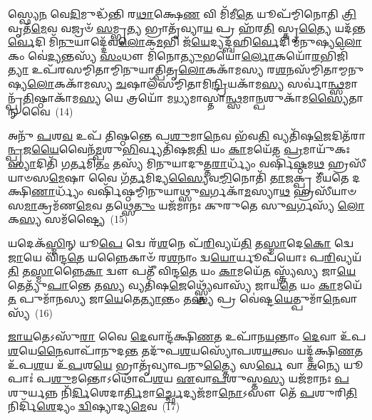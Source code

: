 𑌸𑍍𑌫𑍍𑌯𑍇\-\ul{𑌨} 𑌵𑍇\-\ul{𑌦𑌿}\-𑌮𑍁𑌦𑍍𑌧᳴𑌨𑍍𑌤𑌿 𑌰\-\ul{𑌥𑌾}\-𑌕𑍍𑌷𑍇\-\ul{𑌣} 𑌵𑌿 𑌮𑌿᳴𑌮𑍀\-\ul{𑌤𑍇} 𑌯𑍂𑌪᳴𑌮𑍍𑌮𑌿𑌨𑍋𑌤𑌿 \ul{𑌤𑍍𑌰𑌿}\-𑌵𑍃𑌤᳴\-\ul{𑌮𑍇}\-𑌵 𑌵𑌜𑍍𑌰𑍞᳴ \ul{𑌸}\-𑌮𑍍𑌭𑍃\-\ul{𑌤𑍍𑌯} 𑌭𑍍𑌰𑌾𑌤𑍃᳴𑌵𑍍𑌯𑌾\-\ul{𑌯} 𑌪𑍍𑌰 𑌹᳴𑌰\-\ul{𑌤𑌿} 𑌸𑍍𑌤𑍃\-\ul{𑌤𑍍𑌯𑍈} 𑌯𑌦᳴𑌨𑍍𑌤\-\ul{𑌰𑍍𑌵𑍇}\-𑌦𑌿 𑌮𑌿᳴\-\ul{𑌨𑍁}\-𑌯𑌾𑌦𑍍𑌦𑍇᳴𑌵\-\ul{𑌲𑍋}\-𑌕\-\ul{𑌮}\-𑌭𑌿 𑌜᳴\-\ul{𑌯𑍇}\-𑌦𑍍𑌯𑌦𑍍𑌬᳴𑌹𑌿\-\ul{𑌰𑍍𑌵𑍇}\-𑌦𑌿 𑌮᳴𑌨𑍁𑌷𑍍𑌯\-\ul{𑌲𑍋}\-𑌕𑌂 𑌵𑍇॑\-\ul{𑌦𑍍𑌯}\-𑌨𑍍𑌤𑌸𑍍𑌯᳴ \ul{𑌸𑌂}\-𑌧𑍗 𑌮𑌿᳴𑌨𑍋\-\ul{𑌤𑍍𑌯𑍁}\-𑌭𑌯𑍋॑\-\ul{𑌰𑍍𑌲𑍋}\-𑌕𑌯𑍋᳴\-\ul{𑌰}\-𑌭𑌿𑌜𑌿᳴\-\ul{𑌤𑍍𑌯𑌾} 𑌉𑌪᳴𑌰𑌸𑌮𑍍𑌮𑌿𑌤𑌾𑌮𑍍𑌮𑌿𑌨𑍁𑌯𑌾𑌤𑍍𑌪𑌿𑌤𑍃\-\ul{𑌲𑍋}\-𑌕𑌕𑌾᳴𑌮𑌸𑍍𑌯 𑌰\-\ul{𑌶}\-𑌨𑌸᳴𑌮𑍍𑌮𑌿𑌤𑌾𑌮𑍍𑌮𑌨𑍁𑌷𑍍𑌯\-\ul{𑌲𑍋}\-𑌕𑌕𑌾᳴𑌮𑌸𑍍𑌯 \ul{𑌚}\-𑌷𑌾𑌲᳴𑌸𑌮𑍍𑌮𑌿𑌤𑌾𑌮𑌿\-\ul{𑌨𑍍𑌦𑍍𑌰𑌿}\-𑌯𑌕𑌾᳴𑌮\-\ul{𑌸𑍍𑌯} 𑌸𑌰𑍍𑌵𑌾॑\-\ul{𑌨𑍍𑌥𑍍𑌸}\-𑌮𑌾𑌨𑍍𑌪𑍍𑌰᳴\-\ul{𑌤𑌿}\-𑌷𑍍𑌠𑌾𑌕𑌾᳴𑌮\-\ul{𑌸𑍍𑌯} 𑌯𑍇 𑌤𑍍𑌰𑌯𑍋᳴ 𑌮\-\ul{𑌧𑍍𑌯}\-𑌮𑌾𑌸𑍍𑌤𑌾\-\ul{𑌨𑍍𑌥𑍍𑌸}\-𑌮𑌾\-\ul{𑌨𑍍𑌪}\-𑌶𑍁𑌕𑌾᳴𑌮\-\ul{𑌸𑍍𑌯𑍈}\-𑌤𑌾𑌨𑍍 𑌵𑍈~(14)

𑌅𑌨𑍁᳴ \ul{𑌪}\-𑌶\-\ul{𑌵} 𑌉𑌪᳴ 𑌤𑌿𑌷𑍍𑌠𑌨𑍍𑌤𑍇 𑌪\-\ul{𑌶𑍁}\-𑌮𑌾\-\ul{𑌨𑍇}\-𑌵 𑌭᳴𑌵\-\ul{𑌤𑌿} 𑌵𑍍𑌯𑌤𑌿᳴𑌷\-\ul{𑌜𑍇}\-𑌦𑌿𑌤᳴𑌰𑌾\-\ul{𑌨𑍍𑌪𑍍𑌰}\-𑌜\-\ul{𑌯𑍈}\-𑌵𑍈𑌨᳴\-\ul{𑌮𑍍𑌪}\-𑌶𑍁\-\ul{𑌭𑌿}\-𑌰𑍍𑌵𑍍𑌯𑌤𑌿᳴𑌷𑌜\-\ul{𑌤𑌿} 𑌯𑌂 \ul{𑌕𑌾}\-𑌮𑌯𑍇᳴𑌤 \ul{𑌪𑍍𑌰}\-𑌮𑌾𑌯𑍁᳴𑌕𑌃 \ul{𑌸𑍍𑌯𑌾}\-𑌦𑌿𑌤𑌿᳴ 𑌗\-\ul{𑌰𑍍𑌤}\-𑌮𑌿\-\ul{𑌤𑌂} 𑌤𑌸𑍍𑌯᳴ 𑌮𑌿𑌨𑍁𑌯𑌾𑌦𑍁𑌤𑍍𑌤\-\ul{𑌰𑌾}\-𑌰𑍍𑌧𑍍𑌯𑌂᳴ 𑌵𑌰𑍍\mbox{}𑌷𑌿᳴\-\ul{𑌷𑍍𑌠}\-𑌮\-\ul{𑌥} 𑌹𑍍𑌰𑌸𑍀᳴𑌯𑌾𑍞𑌸\-\ul{𑌮𑍇}\-𑌷𑌾 𑌵𑍈 𑌗᳴\-\ul{𑌰𑍍𑌤}\-𑌮𑌿𑌦𑍍𑌯\-\ul{𑌸𑍍𑌯𑍈}\-𑌵\-\ul{𑌮𑍍𑌮𑌿}\-𑌨𑍋𑌤𑌿᳴ \ul{𑌤𑌾}\-𑌜𑌕𑍍𑌪𑍍𑌰 𑌮𑍀᳴𑌯𑌤𑍇 𑌦𑌕𑍍𑌷𑌿\-\ul{𑌣𑌾}\-𑌰𑍍𑌧𑍍𑌯𑌂᳴ 𑌵𑌰𑍍\mbox{}𑌷𑌿᳴𑌷𑍍𑌠𑌮𑍍𑌮𑌿𑌨𑍁𑌯𑌾𑌥𑍍𑌸𑍁\-\ul{𑌵}\-𑌰𑍍𑌗𑌕𑌾᳴\-\ul{𑌮}\-𑌸𑍍𑌯𑌾\-\ul{𑌥} 𑌹𑍍𑌰𑌸𑍀᳴𑌯𑌾𑍞𑌸\-\ul{𑌮𑌾}\-𑌕𑍍𑌰𑌮᳴𑌣\-\ul{𑌮𑍇}\-𑌵 𑌤𑌥𑍍𑌸𑍇\-\ul{𑌤𑍁𑌂} 𑌯𑌜᳴𑌮𑌾𑌨𑌃 𑌕𑍁𑌰𑍁𑌤𑍇 𑌸𑍁\-\ul{𑌵}\-𑌰𑍍𑌗𑌸𑍍𑌯᳴ \ul{𑌲𑍋}\-𑌕\-\ul{𑌸𑍍𑌯} 𑌸𑌮᳴𑌷𑍍𑌟𑍍𑌯𑍈~(15)

𑌯𑌦𑍇𑌕᳴\-\ul{𑌸𑍍𑌮𑌿}\-𑌨𑍍 𑌯𑍂\-\ul{𑌪𑍇} 𑌦𑍍𑌵𑍇 𑌰᳴\-\ul{𑌶}\-𑌨𑍇 𑌪᳴\-\ul{𑌰𑌿}\-𑌵𑍍𑌯𑌯᳴\-\ul{𑌤𑌿} 𑌤\-\ul{𑌸𑍍𑌮𑌾}\-𑌦𑍇\-\ul{𑌕𑍋} 𑌦𑍍𑌵𑍇 \ul{𑌜𑌾}\-𑌯𑍇 𑌵𑌿᳴𑌨𑍍𑌦\-\ul{𑌤𑍇} 𑌯𑌨𑍍𑌨𑍈𑌕𑌾𑍞᳴ 𑌰\-\ul{𑌶}\-𑌨𑌾𑌂 𑌦𑍍𑌵\-\ul{𑌯𑍋}\-𑌰𑍍𑌯𑍂𑌪᳴𑌯𑍋𑌃 𑌪\-\ul{𑌰𑌿}\-𑌵𑍍𑌯𑌯᳴\-\ul{𑌤𑌿} 𑌤\-\ul{𑌸𑍍𑌮𑌾}\-𑌨𑍍𑌨𑍈\-\ul{𑌕𑌾} 𑌦𑍍𑌵𑍗 𑌪𑌤𑍀᳴ 𑌵𑌿𑌨𑍍𑌦\-\ul{𑌤𑍇} 𑌯𑌂 \ul{𑌕𑌾}\-𑌮𑌯𑍇᳴\-\ul{𑌤} 𑌸𑍍𑌤𑍍𑌰𑍍𑌯᳴𑌸𑍍𑌯 𑌜𑌾\-\ul{𑌯𑍇}\-𑌤𑍇𑌤𑍍𑌯𑍁᳴\-\ul{𑌪𑌾}\-𑌨𑍍𑌤𑍇 𑌤\-\ul{𑌸𑍍𑌯} 𑌵𑍍𑌯𑌤𑌿᳴𑌷\-\ul{𑌜𑍇}\-𑌥𑍍𑌸𑍍𑌤𑍍𑌰𑍍𑌯𑍇᳴𑌵𑌾𑌸𑍍𑌯᳴ 𑌜𑌾𑌯\-\ul{𑌤𑍇} 𑌯𑌂 \ul{𑌕𑌾}\-𑌮𑌯𑍇᳴\-\ul{𑌤} 𑌪𑍁𑌮𑌾᳴𑌨𑌸𑍍𑌯 𑌜𑌾\-\ul{𑌯𑍇}\-𑌤𑍇\-\ul{𑌤𑍍𑌯𑌾}\-𑌨𑍍𑌤𑌂 𑌤\-\ul{𑌸𑍍𑌯} 𑌪𑍍𑌰 𑌵𑍇॑𑌷𑍍𑌟\-\ul{𑌯𑍇}\-𑌤𑍍𑌪𑍁𑌮𑌾᳴\-\ul{𑌨𑍇}\-𑌵𑌾𑌸𑍍𑌯᳴~(16)

\-\ul{𑌜𑌾}\-\-\ul{𑌯}\-𑌤𑍇\-𑌽𑌸𑍁᳴\-\ul{𑌰𑌾} 𑌵𑍈 \ul{𑌦𑍇}\-𑌵𑌾𑌨𑍍𑌦᳴𑌕𑍍𑌷𑌿\-\ul{𑌣}\-𑌤 𑌉𑌪𑌾᳴𑌨\-\ul{𑌯}\-𑌨𑍍𑌤𑌾𑌂 \ul{𑌦𑍇}\-𑌵𑌾 𑌉᳴𑌪\-\ul{𑌶}\-𑌯𑍇\-\ul{𑌨𑍈}\-𑌵𑌾𑌪𑌾᳴𑌨𑍁𑌦\-\ul{𑌨𑍍𑌤} 𑌤𑌦𑍁᳴𑌪\-\ul{𑌶}\-𑌯𑌸𑍍𑌯𑍋᳴𑌪𑌶\-\ul{𑌯}\-𑌤𑍍𑌵𑌂 𑌯𑌦𑍍𑌦᳴𑌕𑍍𑌷𑌿\-\ul{𑌣}\-𑌤 𑌉᳴𑌪\-\ul{𑌶}\-𑌯 𑌉᳴\-\ul{𑌪}\-𑌶\-\ul{𑌯𑍇} 𑌭𑍍𑌰𑌾𑌤𑍃᳴𑌵𑍍𑌯𑌾𑌪𑌨𑍁\-\ul{𑌤𑍍𑌤𑍍𑌯𑍈} 𑌸\-\ul{𑌰𑍍𑌵𑍇} 𑌵𑌾 \ul{𑌅}\-𑌨𑍍𑌯𑍇 𑌯𑍂𑌪𑌾𑌃॑ 𑌪\-\ul{𑌶𑍁}\-𑌮𑌨𑍍𑌤𑍋\-𑌽𑌥𑍋᳴𑌪\-\ul{𑌶}\-𑌯 \ul{𑌏}\-𑌵𑌾\-\ul{𑌪}\-𑌶𑍁𑌸𑍍𑌤\-\ul{𑌸𑍍𑌯} 𑌯𑌜᳴𑌮𑌾𑌨𑌃 \ul{𑌪}\-𑌶𑍁𑌰𑍍𑌯𑌨𑍍𑌨 𑌨𑌿᳴\-\ul{𑌰𑍍𑌦𑌿}\-𑌶𑍇𑌦𑌾\-\ul{𑌰𑍍𑌤𑌿}\-\-𑌮𑌾\-\ul{𑌰𑍍𑌚𑍍𑌛𑍇}\-𑌦𑍍𑌯𑌜᳴𑌮𑌾\-\ul{𑌨𑍋}\-\-𑌽𑌸𑍗 𑌤𑍇᳴ \ul{𑌪}\-𑌶𑍁𑌰𑌿\-\ul{𑌤𑌿} 𑌨𑌿𑌰𑍍𑌦𑌿᳴\-\ul{𑌶𑍇}\-𑌦𑍍𑌯𑌂 \ul{𑌦𑍍𑌵𑌿}\-𑌷𑍍𑌯𑌾𑌦𑍍𑌯\-\ul{𑌮𑍇}\-𑌵~(17)


